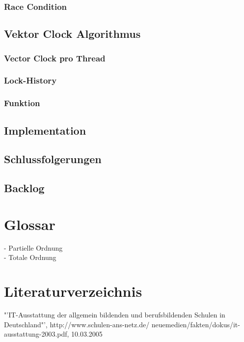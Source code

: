 \documentclass[10pt,a4paper]{article}
\begin{document}
\subsubsection{Race Condition}\label{race_conditons}
\subsection{Vektor Clock Algorithmus}\label{vector_algorithm}
\subsubsection{Vector Clock pro Thread}
\subsubsection{Lock-History}
\subsubsection{Funktion}
\subsection{Implementation}
\subsection{Schlussfolgerungen}
\subsection{Backlog}
\section{Glossar}
- Partielle Ordnung\\
- Totale Ordnung
\section{Literaturverzeichnis}
\renewcommand{\section}[2]{}%
\begin{thebibliography}{xxxxxxxxxxxxx}
"'IT-Ausstattung der allgemein bildenden und berufsbildenden 
                         Schulen in Deutschland"', http://www.schulen-ans-netz.de/   
                         neuemedien/fakten/dokus/it-ausstattung-2003.pdf, 10.03.2005
\end{thebibliography}
\end{document}
